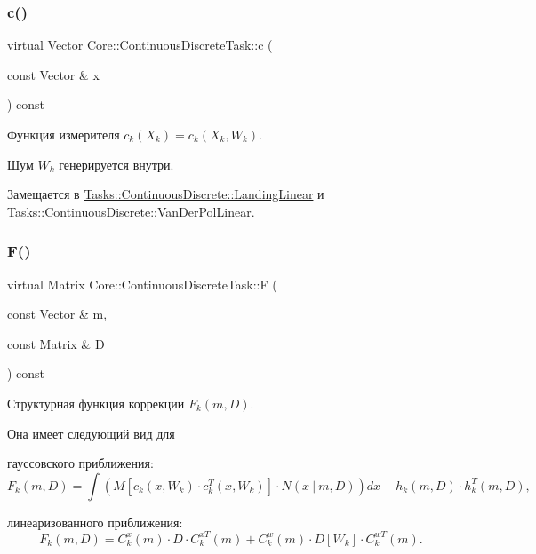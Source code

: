 \subsubsection{\texorpdfstring{c()}{c()}}
{\footnotesize\ttfamily virtual Vector Core\+::\+Continuous\+Discrete\+Task\+::c (\begin{DoxyParamCaption}\item[{const Vector \&}]{x }\end{DoxyParamCaption}) const\hspace{0.3cm}{\ttfamily [pure virtual]}}



Функция измерителя $c_k(X_k) = c_k(X_k, W_k)$. 

Шум $W_k$ генерируется внутри. 

Замещается в \hyperlink{class_tasks_1_1_continuous_discrete_1_1_landing_linear_aa3bddd1de01a202030bbccc1994e10af}{Tasks\+::\+Continuous\+Discrete\+::\+Landing\+Linear} и \hyperlink{class_tasks_1_1_continuous_discrete_1_1_van_der_pol_linear_af2602ff749602f29f5169ea0e1b391ed}{Tasks\+::\+Continuous\+Discrete\+::\+Van\+Der\+Pol\+Linear}.

\hypertarget{class_core_1_1_continuous_discrete_task_a08947ea4d4eb819e0e8530e682a1a377}{}\label{class_core_1_1_continuous_discrete_task_a08947ea4d4eb819e0e8530e682a1a377} 
\subsubsection{\texorpdfstring{F()}{F()}}
{\footnotesize\ttfamily virtual Matrix Core\+::\+Continuous\+Discrete\+Task\+::F (\begin{DoxyParamCaption}\item[{const Vector \&}]{m,  }\item[{const Matrix \&}]{D }\end{DoxyParamCaption}) const\hspace{0.3cm}{\ttfamily [pure virtual]}}



Структурная функция коррекции $F_k(m, D)$. 

Она имеет следующий вид для


\begin{DoxyItemize}
\item гауссовского приближения\+: \[F_k(m, D) = \int (M[c_k(x,W_k)\cdot c_k^T(x, W_k)] \cdot N(x\ |\ m,D))dx - h_k(m,D)\cdot h_k^T(m,D),\]
\item линеаризованного приближения\+: \[F_k(m, D) = C_k^x(m)\cdot D\cdot C_k^{xT}(m) + C_k^w(m)\cdot D[W_k]\cdot C_k^{wT}(m).\]
\end{DoxyItemize}

